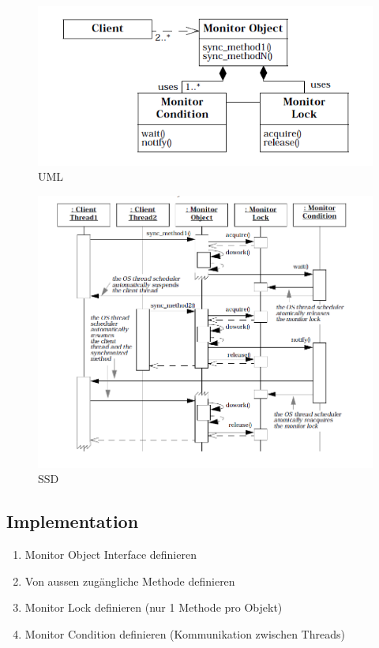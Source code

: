 \begin{figure}[H]
	\centering
	\includegraphics[width=\textwidth]{content/posa2/monitor-object/images/UML.png}
	\caption{UML}
\end{figure}


\begin{figure}[H]
	\centering
	\includegraphics[width=\textwidth]{content/posa2/monitor-object/images/SSD.png}
	\caption{SSD}
\end{figure}


\subsection{Implementation}

\begin{enumerate}
	\item Monitor Object Interface definieren
	\item Von aussen zugängliche Methode definieren
	\item Monitor Lock definieren (nur 1 Methode pro Objekt)
	\item Monitor Condition definieren (Kommunikation zwischen Threads)
\end{enumerate}


